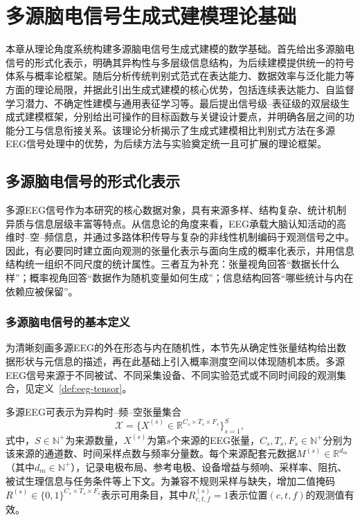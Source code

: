 \chapter{多源脑电信号生成式建模理论基础}
\label{chapter2}

本章从理论角度系统构建多源脑电信号生成式建模的数学基础。首先给出多源脑电信号的形式化表示，明确其异构性与多层级信息结构，为后续建模提供统一的符号体系与概率论框架。随后分析传统判别式范式在表达能力、数据效率与泛化能力等方面的理论局限，并据此引出生成式建模的核心优势，包括连续表达能力、自监督学习潜力、不确定性建模与通用表征学习等。最后提出信号级--表征级的双层级生成式建模框架，分别给出可操作的目标函数与关键设计要点，并明确各层之间的功能分工与信息衔接关系。该理论分析揭示了生成式建模相比判别式方法在多源EEG信号处理中的优势，为后续方法与实验奠定统一且可扩展的理论框架。


\section{多源脑电信号的形式化表示}
\label{sec:formal}
多源EEG信号作为本研究的核心数据对象，具有来源多样、结构复杂、统计机制异质与信息层级丰富等特点。从信息论的角度来看，EEG承载大脑认知活动的高维时--空--频信息，并通过多路体积传导与复杂的非线性机制编码于观测信号之中。因此，有必要同时建立面向观测的张量化表示与面向生成的概率化表示，并用信息结构统一组织不同尺度的统计属性。三者互为补充：张量视角回答“数据长什么样”；概率视角回答“数据作为随机变量如何生成”；信息结构回答“哪些统计与内在依赖应被保留”。

\subsection{多源脑电信号的基本定义}
为清晰刻画多源EEG的外在形态与内在随机性，本节先从确定性张量结构给出数据形状与元信息的描述，再在此基础上引入概率测度空间以体现随机本质。多源EEG信号来源于不同被试、不同采集设备、不同实验范式或不同时间段的观测集合，见定义~\ref{def:eeg-tensor}。

\begin{definition}[多源EEG信号的张量化表示]
\label{def:eeg-tensor}
多源EEG可表示为异构时--频--空张量集合
\begin{equation}
\label{eq:tensor-collection}
\mathcal{X} = \Big\{ X^{(s)} \in \mathbb{R}^{C_s \times T_s \times F_s} \Big\}_{s=1}^{S},
\end{equation}
式中，$S \in \mathbb{N}^+$为来源数量，$X^{(s)}$为第$s$个来源的EEG张量，$C_s, T_s, F_s \in \mathbb{N}^+$分别为该来源的通道数、时间采样点数与频率分量数。每个来源配套元数据$M^{(s)} \in \mathbb{R}^{d_m}$（其中$d_m \in \mathbb{N}^+$），记录电极布局、参考电极、设备增益与频响、采样率、阻抗、被试生理信息与任务条件等上下文。为兼容不规则采样与缺失，增加二值掩码$R^{(s)} \in \{0,1\}^{C_s \times T_s \times F_s}$表示可用条目，其中$R^{(s)}_{c,t,f} = 1$表示位置$(c,t,f)$的观测值有效。
\end{definition}

